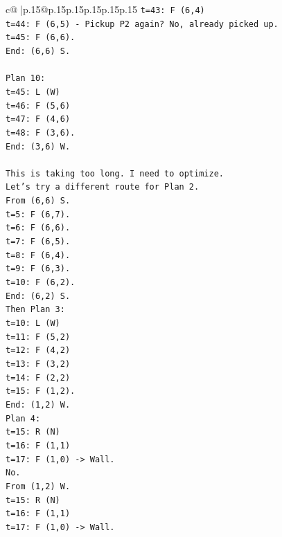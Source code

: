 \documentclass{article}
\begin{document}
{\begin{supertabular}{c@{$\;$}|p{.15\linewidth}@{}p{.15\linewidth}p{.15\linewidth}p{.15\linewidth}p{.15\linewidth}p{.15\linewidth}}
{{{\texttt{t=43: F (6,4)} \\
\texttt{t=44: F (6,5) {-} Pickup P2 again? No, already picked up.} \\
\texttt{t=45: F (6,6).} \\
\texttt{End: (6,6) S.} \\
\\ 
\texttt{Plan 10:} \\
\texttt{t=45: L (W)} \\
\texttt{t=46: F (5,6)} \\
\texttt{t=47: F (4,6)} \\
\texttt{t=48: F (3,6).} \\
\texttt{End: (3,6) W.} \\
\\ 
\texttt{This is taking too long. I need to optimize.} \\
\texttt{Let's try a different route for Plan 2.} \\
\texttt{From (6,6) S.} \\
\texttt{t=5: F (6,7).} \\
\texttt{t=6: F (6,6).} \\
\texttt{t=7: F (6,5).} \\
\texttt{t=8: F (6,4).} \\
\texttt{t=9: F (6,3).} \\
\texttt{t=10: F (6,2).} \\
\texttt{End: (6,2) S.} \\
\texttt{Then Plan 3:} \\
\texttt{t=10: L (W)} \\
\texttt{t=11: F (5,2)} \\
\texttt{t=12: F (4,2)} \\
\texttt{t=13: F (3,2)} \\
\texttt{t=14: F (2,2)} \\
\texttt{t=15: F (1,2).} \\
\texttt{End: (1,2) W.} \\
\texttt{Plan 4:} \\
\texttt{t=15: R (N)} \\
\texttt{t=16: F (1,1)} \\
\texttt{t=17: F (1,0) {-}> Wall.} \\
\texttt{No.} \\
\texttt{From (1,2) W.} \\
\texttt{t=15: R (N)} \\
\texttt{t=16: F (1,1)} \\
\texttt{t=17: F (1,0) {-}> Wall.} \\
}}}
\end{supertabular}}
\end{document}
